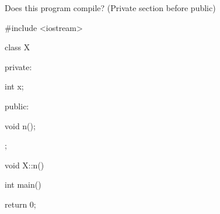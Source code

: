 Does this program compile? (Private section before public)



\begin{consolethree}[escapeinside=||]

#include <iostream>



class X

{

private:

    int x;

public:

    void n();

};



void X::n()

{

}



int main()

{

    return 0;

}

\end{consolethree}


